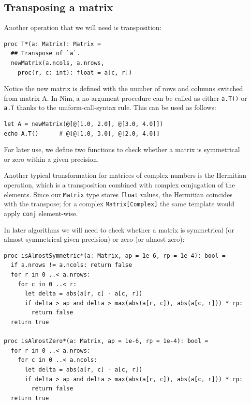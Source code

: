 \documentclass[justified, sixbynine]{tufte-book}
\def\ft{\small\tt}
\theoremstyle{plain}%
\newtheorem * {corollary}{Corollary}
\theoremstyle{definition}
\theoremstyle{remark}
\newtheorem * {remark}{Remark}
\newtheorem * {note}{Note}
\begin{document}
\begin{fullwidth}
\goodbreak\subsection{Transposing a matrix}


Another operation that we will need is transposition:

\begin{lstlisting}[caption={in file: {\ft nlib.nim}}]
proc T*(a: Matrix): Matrix =
  ## Transpose of `a`.
  newMatrix(a.ncols, a.nrows,
    proc(r, c: int): float = a[c, r])
\end{lstlisting}

Notice the new matrix is defined with the number of rows and columns switched from matrix A. In Nim, a no-argument procedure can be called as either {\ft a.T()} or {\ft a.T} thanks to the uniform-call-syntax rule.
This can be used as follows:

\begin{lstlisting}
let A = newMatrix(@[@[1.0, 2.0], @[3.0, 4.0]])
echo A.T()      # @[@[1.0, 3.0], @[2.0, 4.0]]
\end{lstlisting}

For later use, we define two functions to check whether a matrix is symmetrical or zero within a given precision.

Another typical transformation for matrices of complex numbers is the Hermitian operation, which is a transposition combined with complex conjugation of the elements. Since our {\ft Matrix} type stores {\ft float} values, the Hermitian coincides with the transpose; for a complex {\ft Matrix[Complex]} the same template would apply {\ft conj} element-wise.


In later algorithms we will need to check whether a matrix is symmetrical (or almost symmetrical given precision) or zero (or almost zero):

\begin{lstlisting}[caption={in file: {\ft nlib.nim}}]
proc isAlmostSymmetric*(a: Matrix, ap = 1e-6, rp = 1e-4): bool =
  if a.nrows != a.ncols: return false
  for r in 0 ..< a.nrows:
    for c in 0 ..< r:
      let delta = abs(a[r, c] - a[c, r])
      if delta > ap and delta > max(abs(a[r, c]), abs(a[c, r])) * rp:
        return false
  return true

proc isAlmostZero*(a: Matrix, ap = 1e-6, rp = 1e-4): bool =
  for r in 0 ..< a.nrows:
    for c in 0 ..< a.ncols:
      let delta = abs(a[r, c] - a[c, r])
      if delta > ap and delta > max(abs(a[r, c]), abs(a[c, r])) * rp:
        return false
  return true
\end{lstlisting}


\end{fullwidth}
\end{document}
